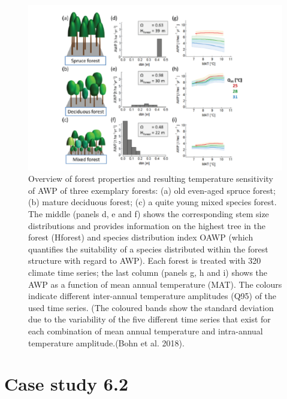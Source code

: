 \documentclass[12pt,oneside]{book}
\begin{document}
\begin{figure}

{\centering \includegraphics[width=0.8\linewidth]{figures/chap6/f636_bohn2} 

}

\caption{Overview of forest properties and resulting temperature sensitivity of AWP of three exemplary forests: (a) old even-aged spruce forest; (b) mature deciduous forest; (c) a quite young mixed species forest. The middle (panels d, e and f) shows the corresponding stem size distributions and provides information on the highest tree in the forest (Hforest) and species distribution index OAWP (which quantifies the suitability of a species distributed within the forest structure with regard to AWP). Each forest is treated with 320 climate time series; the last column (panels g, h and i) shows the AWP as a function of mean annual temperature (MAT). The colours indicate different inter-annual temperature amplitudes (Q95) of the used time series. (The coloured bands show the standard deviation due to the variability of the five different time series that exist for each combination of mean annual temperature and intra-annual temperature amplitude.(Bohn et al. 2018).}\label{fig:f636}
\end{figure}

\section{Case study 6.2}\label{case-study-6.2}
\end{document}
